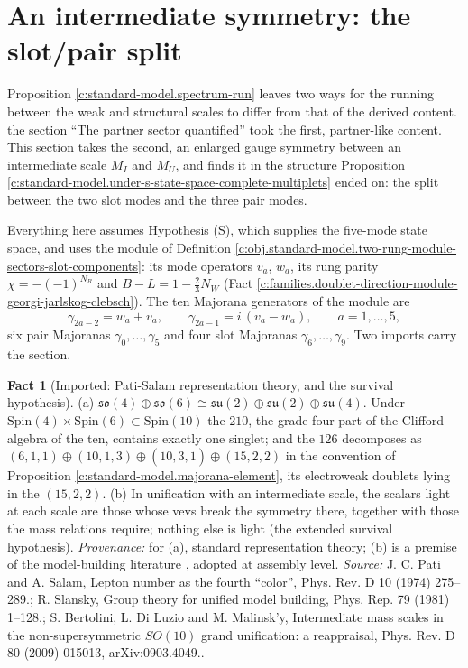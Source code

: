 \documentclass[11pt]{article}
\theoremstyle{definition}
\newtheorem{fact}[theorem]{Fact}
\theoremstyle{plain}
\providecommand{\su}{}\renewcommand{\su}{\mathfrak{su}}
\begin{document}
\section{An intermediate symmetry: the slot/pair split}

\label{c:note.standard-model.setting-intermediate-symmetry-slot-pair-split}
Proposition \ref{c:standard-model.spectrum-run} leaves two ways for the running between the weak and structural scales to differ from that of the derived content. the section ``The partner sector quantified'' took the first, partner-like content. This section takes the second, an enlarged gauge symmetry between an intermediate scale $M_{I}$ and $M_{U}$, and finds it in the structure Proposition \ref{c:standard-model.under-s-state-space-complete-multiplets} ended on: the split between the two slot modes and the three pair modes.

Everything here assumes Hypothesis (S), which supplies the five-mode state space, and uses the module of Definition \ref{c:obj.standard-model.two-rung-module-sectors-slot-components}: its mode operators $v_{a}$, $w_{a}$, its rung parity $\chi = -(-1)^{N_{R}}$ and $B - L = 1 - \tfrac23 N_{W}$ (Fact \ref{c:families.doublet-direction-module-georgi-jarlskog-clebsch}). The ten Majorana generators of the module are
\[
\gamma_{2a-2} = w_{a} + v_{a}, \qquad \gamma_{2a-1} = i\,(v_{a} - w_{a}), \qquad a = 1, \ldots, 5,
\]
six pair Majoranas $\gamma_{0}, \ldots, \gamma_{5}$ and four slot Majoranas $\gamma_{6}, \ldots, \gamma_{9}$. Two imports carry the section.

\begin{fact}[Imported: Pati-Salam representation theory, and the survival hypothesis]\label{c:standard-model.imported-pati-salam-representation-theory-survival}
(a) $\mathfrak{so}(4) \oplus \mathfrak{so}(6) \cong \su(2) \oplus \su(2) \oplus \su(4)$. Under $\mathrm{Spin}(4) \times \mathrm{Spin}(6) \subset \mathrm{Spin}(10)$ the $210$, the grade-four part of the Clifford algebra of the ten, contains exactly one singlet; and the $126$ decomposes as $(6,1,1) \oplus (10,1,3) \oplus (\overline{10},3,1) \oplus (15,2,2)$ in the convention of Proposition \ref{c:standard-model.majorana-element}, its electroweak doublets lying in the $(15,2,2)$. (b) In unification with an intermediate scale, the scalars light at each scale are those whose vevs break the symmetry there, together with those the mass relations require; nothing else is light (the extended survival hypothesis). \emph{Provenance:} \cite{PatiSalam1974, Slansky1981} for (a), standard representation theory; (b) is a premise of the model-building literature \cite{BertoliniDiLuzioMalinsky2009}, adopted at assembly level.
\emph{Source:} J. C. Pati and A. Salam, Lepton number as the fourth ``color'', Phys. Rev. D 10 (1974) 275--289.; R. Slansky, Group theory for unified model building, Phys. Rep. 79 (1981) 1--128.; S. Bertolini, L. Di Luzio and M. Malinsk'y, Intermediate mass scales in the non-supersymmetric $SO(10)$ grand unification: a reappraisal, Phys. Rev. D 80 (2009) 015013, arXiv:0903.4049..
\end{fact}
\end{document}
